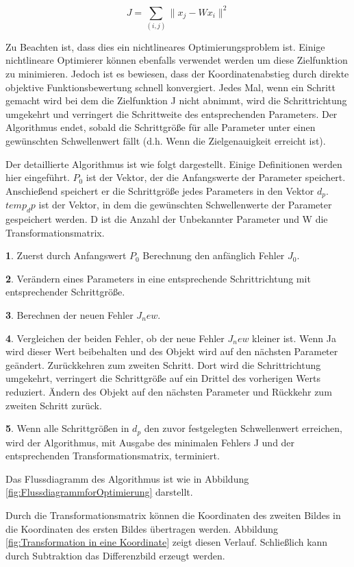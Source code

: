 \begin{equation}
   J = \sum_{(i,j)}\lVert x_j - Wx_i \rVert ^2
\end{equation}

Zu Beachten ist, dass dies ein nichtlineares Optimierungsproblem ist. Einige nichtlineare Optimierer können ebenfalls verwendet werden um diese Zielfunktion zu minimieren. Jedoch ist es bewiesen, dass der Koordinatenabstieg durch direkte objektive Funktionsbewertung schnell konvergiert. Jedes Mal, wenn ein Schritt gemacht wird bei dem die Zielfunktion J nicht abnimmt, wird die Schrittrichtung umgekehrt und verringert die Schrittweite des entsprechenden Parameters. Der Algorithmus endet, sobald die Schrittgröße für alle Parameter unter einen gewünschten Schwellenwert fällt (d.h. Wenn die Zielgenauigkeit erreicht ist). 

Der detaillierte Algorithmus ist wie folgt dargestellt. Einige Definitionen werden hier eingeführt. $P_0$ ist der Vektor, der die Anfangswerte der Parameter speichert. Anschießend speichert er die Schrittgröße jedes Parameters in den Vektor $d_p$. $temp_dp$ ist der Vektor, in dem die gewünschten Schwellenwerte der Parameter gespeichert werden. D ist die Anzahl der Unbekannter Parameter und W die Transformationsmatrix.

\textbf{1}. Zuerst durch Anfangswert $P_0$ Berechnung den anfänglich Fehler $J_0$.

\textbf{2}. Verändern eines Parameters in eine entsprechende Schrittrichtung mit entsprechender Schrittgröße.

\textbf{3}. Berechnen der neuen Fehler $J_new$.

\textbf{4}. Vergleichen der beiden Fehler, ob der neue Fehler $J_new$ kleiner ist. Wenn Ja wird dieser Wert beibehalten und des Objekt wird auf den nächsten Parameter geändert. Zurückkehren zum zweiten Schritt. Dort wird die Schrittrichtung umgekehrt, verringert die Schrittgröße auf ein Drittel des vorherigen Werts reduziert. Ändern des Objekt auf den nächsten Parameter und Rückkehr zum zweiten Schritt zurück.

\textbf{5}. Wenn alle Schrittgrößen in $d_p$ den zuvor festgelegten Schwellenwert erreichen, wird der Algorithmus, mit Ausgabe des minimalen Fehlers J und der entsprechenden Transformationsmatrix, terminiert.

Das Flussdiagramm des Algorithmus ist wie in Abbildung \ref{fig:FlussdiagrammforOptimierung} darstellt.

Durch die Transformationsmatrix können die Koordinaten des zweiten Bildes in die Koordinaten des ersten Bildes übertragen werden. Abbildung \ref{fig:Transformation in eine Koordinate} zeigt diesen Verlauf. Schließlich kann durch Subtraktion das Differenzbild erzeugt werden.

